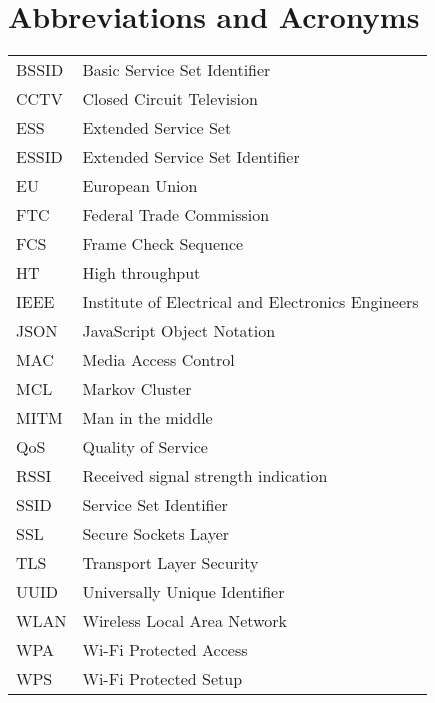 \chapter*{Abbreviations and Acronyms}


\noindent
\begin{longtable}{@{}p{}p{}@{}}
BSSID & Basic Service Set Identifier \\
CCTV & Closed Circuit Television \\
ESS & Extended Service Set \\
ESSID & Extended Service Set Identifier \\
EU & European Union \\
FTC & Federal Trade Commission \\
FCS & Frame Check Sequence \\
HT & High throughput \\
IEEE & Institute of Electrical and Electronics Engineers \\
JSON & JavaScript Object Notation \\
MAC & Media Access Control \\
MCL & Markov Cluster \\
MITM & Man in the middle \\
QoS & Quality of Service \\
RSSI & Received signal strength indication \\
SSID & Service Set Identifier \\
SSL & Secure Sockets Layer \\
TLS & Transport Layer Security \\
UUID & Universally Unique Identifier \\
WLAN & Wireless Local Area Network \\
WPA & Wi-Fi Protected Access \\
WPS & Wi-Fi Protected Setup \\
\end{longtable}
